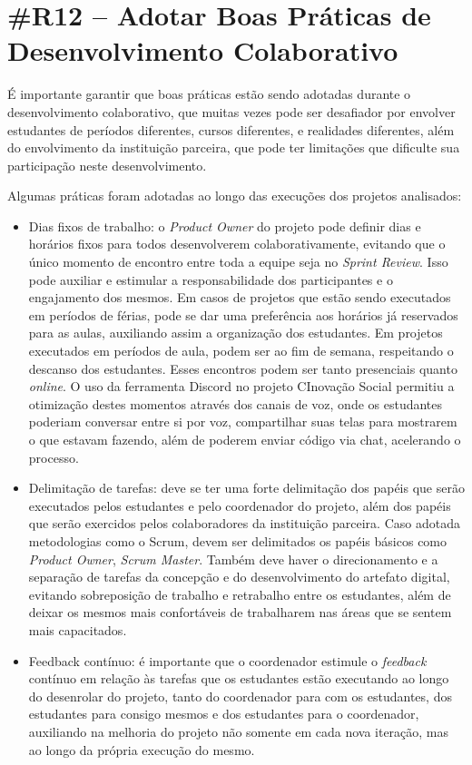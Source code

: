 \section*{\#R12 – Adotar Boas Práticas de Desenvolvimento Colaborativo}

É importante garantir que boas práticas estão sendo adotadas durante o desenvolvimento colaborativo, que muitas vezes pode ser desafiador por envolver estudantes de períodos diferentes, cursos diferentes, e realidades diferentes, além do envolvimento da instituição parceira, que pode ter limitações que dificulte sua participação neste desenvolvimento.

Algumas práticas foram adotadas ao longo das execuções dos projetos analisados:
\begin{itemize}
    \item Dias fixos de trabalho: o \textit{Product Owner} do projeto pode definir dias e horários fixos para todos desenvolverem colaborativamente, evitando que o único momento de encontro entre toda a equipe seja no \textit{Sprint Review}. Isso pode auxiliar e estimular a responsabilidade dos participantes e o engajamento dos mesmos. Em casos de projetos que estão sendo executados em períodos de férias, pode se dar uma preferência aos horários já reservados para as aulas, auxiliando assim a organização dos estudantes. Em projetos executados em períodos de aula, podem ser ao fim de semana, respeitando o descanso dos estudantes. Esses encontros podem ser tanto presenciais quanto \textit{online}. O uso da ferramenta Discord no projeto CInovação Social permitiu a otimização destes momentos através dos canais de voz, onde os estudantes poderiam conversar entre si por voz, compartilhar suas telas para mostrarem o que estavam fazendo, além de poderem enviar código via chat, acelerando o processo.
    
    \item Delimitação de tarefas: deve se ter uma forte delimitação dos papéis que serão executados pelos estudantes e pelo coordenador do projeto, além dos papéis que serão exercidos pelos colaboradores da instituição parceira. Caso adotada metodologias como o Scrum, devem ser delimitados os papéis básicos como \textit{Product Owner}, \textit{Scrum Master}. Também deve haver o direcionamento e a separação de tarefas da concepção e do desenvolvimento do artefato digital, evitando sobreposição de trabalho e retrabalho entre os estudantes, além de deixar os mesmos mais confortáveis de trabalharem nas áreas que se sentem mais capacitados.

    \item Feedback contínuo: é importante que o coordenador estimule o \textit{feedback} contínuo em relação às tarefas que os estudantes estão executando ao longo do desenrolar do projeto, tanto do coordenador para com os estudantes, dos estudantes para consigo mesmos e dos estudantes para o coordenador, auxiliando na melhoria do projeto não somente em cada nova iteração, mas ao longo da própria execução do mesmo.

\end{itemize}
